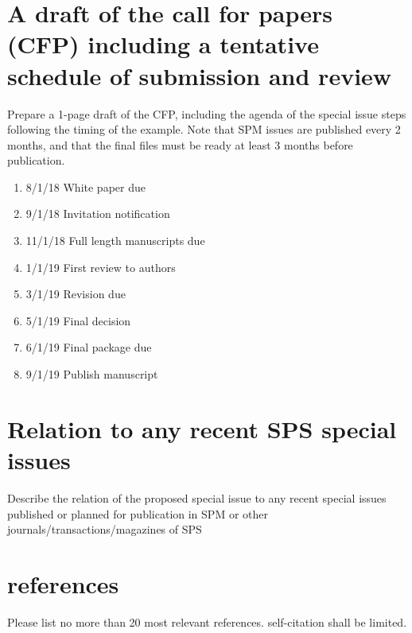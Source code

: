 \documentclass[journal,onecolumn]{IEEEtran}
\begin{document}
\section{A draft of the call for papers (CFP) including a tentative schedule of submission and review}
\label{secge}
\par Prepare a 1-page draft of the CFP, including the agenda of the special issue steps following the timing of the example. Note that SPM issues are published every 2 months, and that the final files must be ready at least 3 months before publication.
\begin{enumerate}
    \item 8/1/18 White paper due
    \item 9/1/18 Invitation notification
    \item 11/1/18 Full length manuscripts due
    \item 1/1/19 First review to authors
    \item 3/1/19 Revision due
    \item 5/1/19 Final decision
    \item 6/1/19 Final package due
    \item 9/1/19 Publish manuscript
\end{enumerate}
\section{Relation to any recent SPS special issues}
\label{secge}
\par Describe the relation of the proposed special issue to any recent special issues published or planned for publication in SPM or other journals/transactions/magazines of SPS
\section{references}
\label{secref}
\par Please list no more than 20 most relevant references. self-citation shall be limited.


\end{document}
